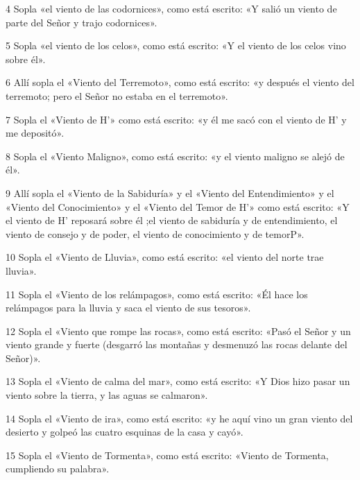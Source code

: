 \par 4 Sopla «el viento de las codornices», como está escrito: «Y salió un viento de parte del Señor y trajo codornices».

\par 5 Sopla «el viento de los celos», como está escrito: «Y el viento de los celos vino sobre él».

\par 6 Allí sopla el «Viento del Terremoto», como está escrito: «y después el viento del terremoto; pero el Señor no estaba en el terremoto».

\par 7 Sopla el «Viento de H'» como está escrito: «y él me sacó con el viento de H' y me depositó».

\par 8 Sopla el «Viento Maligno», como está escrito: «y el viento maligno se alejó de él».

\par 9 Allí sopla el «Viento de la Sabiduría» y el «Viento del Entendimiento» y el «Viento del Conocimiento» y el «Viento del Temor de H'» como está escrito: «Y el viento de H' reposará sobre él ;el viento de sabiduría y de entendimiento, el viento de consejo y de poder, el viento de conocimiento y de temorP».

\par 10 Sopla el «Viento de Lluvia», como está escrito: «el viento del norte trae lluvia».

\par 11 Sopla el «Viento de los relámpagos», como está escrito: «Él hace los relámpagos para la lluvia y saca el viento de sus tesoros».

\par 12 Sopla el «Viento que rompe las rocas», como está escrito: «Pasó el Señor y un viento grande y fuerte (desgarró las montañas y desmenuzó las rocas delante del Señor)».

\par 13 Sopla el «Viento de calma del mar», como está escrito: «Y Dios hizo pasar un viento sobre la tierra, y las aguas se calmaron».

\par 14 Sopla el «Viento de ira», como está escrito: «y he aquí vino un gran viento del desierto y golpeó las cuatro esquinas de la casa y cayó».

\par 15 Sopla el «Viento de Tormenta», como está escrito: «Viento de Tormenta, cumpliendo su palabra».

